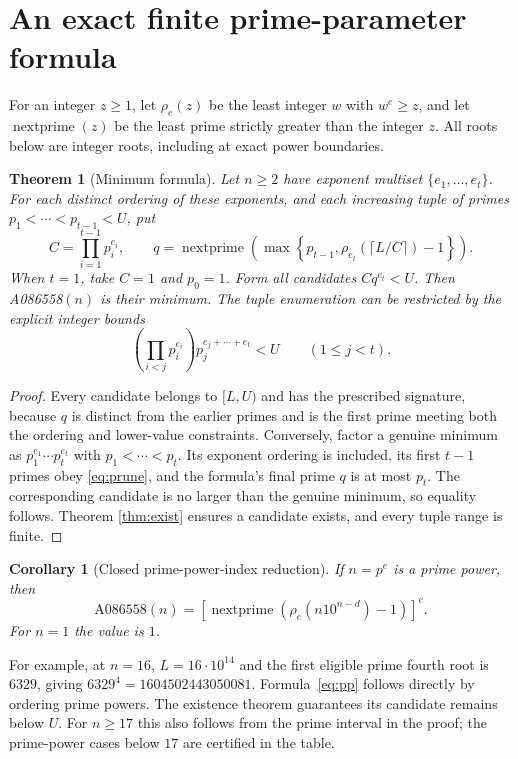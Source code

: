 \documentclass[10pt]{article}
\newtheorem{theorem}{Theorem}
\newtheorem{corollary}{Corollary}
\newcommand{\np}{\operatorname{nextprime}}
\begin{document}
\section{An exact finite prime-parameter formula}
For an integer $z\ge1$, let $\rho_e(z)$ be the least integer $w$ with
$w^e\ge z$, and let $\np(z)$ be the least prime strictly greater than
the integer $z$. All roots below are integer roots, including at exact
power boundaries.

\begin{theorem}[Minimum formula]\label{thm:min}
Let $n\ge2$ have exponent multiset $\{e_1,\ldots,e_t\}$. For each distinct
ordering of these exponents, and each increasing tuple of primes
$p_1<\cdots<p_{t-1}<U$, put
\[
 C=\prod_{i=1}^{t-1}p_i^{e_i},\qquad
 q=\np\left(\max\left\{p_{t-1},
             \rho_{e_t}(\lceil L/C\rceil)-1\right\}\right).
\]
When $t=1$, take $C=1$ and $p_0=1$. Form all candidates $Cq^{e_t}<U$.
Then A086558$(n)$ is their minimum. The tuple enumeration can be restricted
by the explicit integer bounds
\begin{equation}\label{eq:prune}
 \left(\prod_{i<j}p_i^{e_i}\right)p_j^{e_j+\cdots+e_t}<U
 \qquad(1\le j<t).
\end{equation}
\end{theorem}
\begin{proof}
Every candidate belongs to $[L,U)$ and has the prescribed signature,
because $q$ is distinct from the earlier primes and is the first prime
meeting both the ordering and lower-value constraints.
Conversely, factor a genuine minimum as
$p_1^{e_1}\cdots p_t^{e_t}$ with $p_1<\cdots<p_t$. Its exponent ordering
is included, its first $t-1$ primes obey \eqref{eq:prune}, and the
formula's final prime $q$ is at most $p_t$. The corresponding candidate
is no larger than the genuine minimum, so equality follows. Theorem
\ref{thm:exist} ensures a candidate exists, and every tuple range is finite.
\end{proof}

\begin{corollary}[Closed prime-power-index reduction]
If $n=p^e$ is a prime power, then
\begin{equation}\label{eq:pp}
 \mathrm{A086558}(n)=
 \left[\np\left(\rho_e(n10^{n-d})-1\right)\right]^e.
\end{equation}
For $n=1$ the value is $1$.
\end{corollary}
For example, at $n=16$, $L=16\cdot10^{14}$ and the first eligible prime
fourth root is $6329$, giving $6329^4=1604502443050081$.
Formula~\eqref{eq:pp} follows directly by ordering prime powers. The
existence theorem guarantees its candidate remains below $U$.
For $n\ge17$ this also follows from the prime interval in the proof;
the prime-power cases below $17$ are certified in the table.
\end{document}
